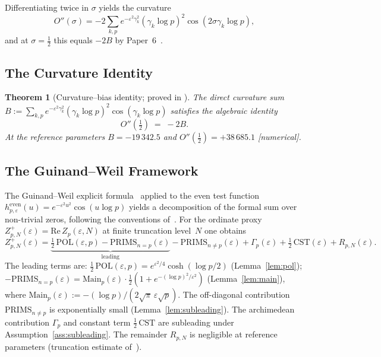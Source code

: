 \documentclass[11pt]{article}
\newtheorem{theorem}{Theorem}[section]
\begin{document}
Differentiating twice in $\sigma$ yields the curvature
\[
O''(\sigma)=-2\sum_{k,p}e^{-\varepsilon^2\gamma_k^2}
(\gamma_k\log p)^2\cos(2\sigma\gamma_k\log p),
\]
and at $\sigma=\tfrac12$ this equals $-2B$ by Paper~6~\cite{Paper6}.

\subsection{The Curvature Identity}

\begin{theorem}[Curvature--bias identity; proved in \cite{Paper6}]
\label{thm:curvbias}
The direct curvature sum $B:=\sum_{k,p}e^{-\varepsilon^2\gamma_k^2}(\gamma_k\log p)^2\cos(\gamma_k\log p)$
satisfies the algebraic identity
\[
O''\!\left(\tfrac12\right) \;=\; -2B.
\]
At the reference parameters $B=-19\,342.5$ and $O''(\tfrac12)=+38\,685.1$ [numerical].
\end{theorem}

\subsection{The Guinand--Weil Framework}

The Guinand--Weil explicit formula~\cite{Guinand,Weil} applied to the
even test function $h^{\mathrm{even}}_{p,\varepsilon}(u)=e^{-\varepsilon^2 u^2}\cos(u\log p)$
yields a decomposition of the formal sum over non-trivial zeros,
following the conventions of~\cite{IwaniecKowalski04}.
For the ordinate proxy $Z_{p,N}^+(\varepsilon)=\mathrm{Re}\,Z_p(\varepsilon,N)$
at finite truncation level~$N$ one obtains
\begin{equation}\label{eq:gw-decomp}
Z_{p,N}^+(\varepsilon)
  = \underbrace{\tfrac12\,\mathrm{POL}(\varepsilon,p)
    - \mathrm{PRIMS}_{n=p}(\varepsilon)}_{\text{leading}}
    - \mathrm{PRIMS}_{n\ne p}(\varepsilon)
    + \Gamma_p(\varepsilon)
    + \tfrac12\,\mathrm{CST}(\varepsilon)
    + R_{p,N}(\varepsilon).
\end{equation}
The leading terms are:
$\tfrac12\,\mathrm{POL}(\varepsilon,p)=e^{\varepsilon^2/4}\cosh(\log p/2)$
(Lemma~\ref{lem:pol});
$-\mathrm{PRIMS}_{n=p}(\varepsilon)
=\mathrm{Main}_p(\varepsilon)\cdot\tfrac12(1+e^{-(\log p)^2/\varepsilon^2})$
(Lemma~\ref{lem:main}),
where $\mathrm{Main}_p(\varepsilon):=-({\log p})/({2\sqrt{\pi}\,\varepsilon\sqrt{p}})$.
The off-diagonal contribution $\mathrm{PRIMS}_{n\ne p}$ is exponentially
small (Lemma~\ref{lem:subleading}).
The archimedean contribution $\Gamma_p$ and constant term
$\tfrac12\,\mathrm{CST}$ are subleading under
Assumption~\ref{ass:subleading}.
The remainder $R_{p,N}$ is negligible at reference parameters
(truncation estimate of~\cite{Paper6}).
\end{document}
